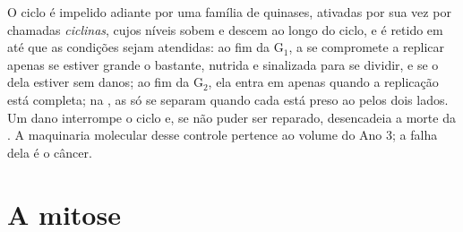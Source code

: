 \begin{proposition}\label{prop:b1:replication-mitosis:checkpoints}
O ciclo é impelido adiante por uma família de  quinases,
ativadas por sua vez por  chamadas \emph{ciclinas}, cujos
níveis sobem e descem ao longo do ciclo, e é retido em \emph{} até que as condições sejam atendidas: ao fim da G$_1$, a
 se compromete a replicar apenas se estiver grande o bastante,
nutrida e sinalizada para se dividir, e se o  dela estiver sem danos;
ao fim da G$_2$, ela entra em  apenas quando a replicação está
completa; na , as  só se separam quando cada 
está preso ao  pelos dois lados. Um dano interrompe o ciclo e, se
não puder ser reparado, desencadeia a morte da . A maquinaria
molecular desse controle pertence ao volume do Ano 3; a falha dela é o
câncer.
\end{proposition}

\section{A mitose}


